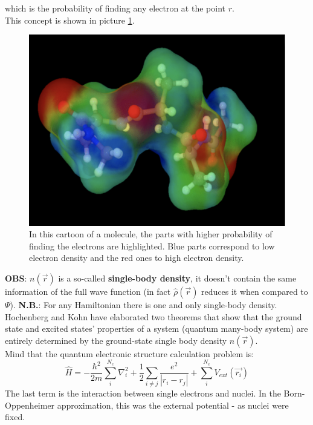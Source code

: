 which is the probability of finding any electron at the point $r$. \\
This concept is shown in picture \ref{molecule}. \\
\begin{figure}[htbp!]
	\centering
	\includegraphics[scale=0.30]{img_14}
	\caption{In this cartoon of a molecule, the parts with higher probability of finding the electrons are highlighted. Blue parts correspond to low electron density and the red ones to high electron density.}
	\label{molecule}
\end{figure}
\newline
\textbf{OBS}: $n(\vec{r})$ is a so-called \textbf{single-body density}, it doesn't contain the same information of the full wave function (in fact $\hat{\rho}(\vec{r})$ reduces it when compared to $\Psi$). 
\textbf{N.B.}: For any Hamiltonian there is one and only single-body density.\\

Hochenberg and Kohn have elaborated two theorems that show that the ground state and excited states' properties of a system (quantum many-body system) are entirely determined by the ground-state single body density $n(\vec{r})$.\\
Mind that the quantum electronic structure calculation problem is:
\[
\hat{H}=-\frac{\hbar^2}{2m}\sum_i^{N_e}\nabla_i^2+\frac{1}{2}\sum_{i\neq j} \frac{e^2}{|r_i-r_j|}+\sum_i^{N_e}V_{ext}(\vec{r_i})
\]
The last term is the interaction between single electrons and nuclei. 
In the Born-Oppenheimer approximation, this was the external potential - as nuclei were fixed.\\

